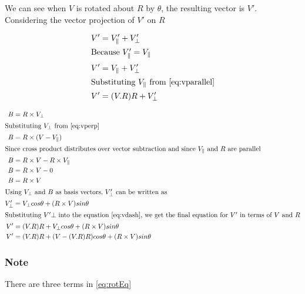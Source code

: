 \documentclass{article}
\begin{document}
    \noindent We can see when $V$ is rotated about $R$ by $\theta$, the resulting vector is $V'$. Considering the vector projection of $V'$ on $R$
    
    \begin{align}
        V' &= V'_{\parallel} + V'_{\perp} \\
        \intertext{Because $V'_{\parallel} = V_{\parallel}$}
        V' &= V_{\parallel} + V'_{\perp} \\
        \intertext{Substituting $V_{\parallel}$ from \ref{eq:vparallel}}
        V' &= (V.R) R + V'_{\perp} \label{eq:vdash}
    \end{align}

    
        \begin{align}
        B &= R \times V_{\perp} \\
        \intertext{Substituting $V_{\perp}$ from \ref{eq:vperp}}
        B &= R \times (V - V_{\parallel}) \\
        \intertext{Since cross product distributes over vector subtraction and since $V_{\parallel}$ and $R$ are parallel}
        B &= R \times V - R \times V_{\parallel} \\
        B &= R \times V - 0 \\
        B &= R \times V \label{eq:b} \\
        \intertext{Using $V_{\perp}$ and $B$ as basis vectors, $V'_{\perp}$ can be written as}
        V'_{\perp} &= V_{\perp} cos\theta + (R \times V) sin\theta \\
        \intertext{Substituting $V'{\perp}$ into the equation \ref{eq:vdash}, we get the final equation for $V'$ in terms of $V$ and $R$}
        V' &= (V.R) R + V_{\perp} cos\theta + (R \times V) sin\theta \\ 
        V' &= (V.R) R + (V - (V.R) R) cos\theta + (R \times V) sin\theta \label{eq:rotEq}
    \end{align}
    
    \subsubsection*{Note}
    \noindent There are three terms in \ref{eq:rotEq} 
\end{document}
